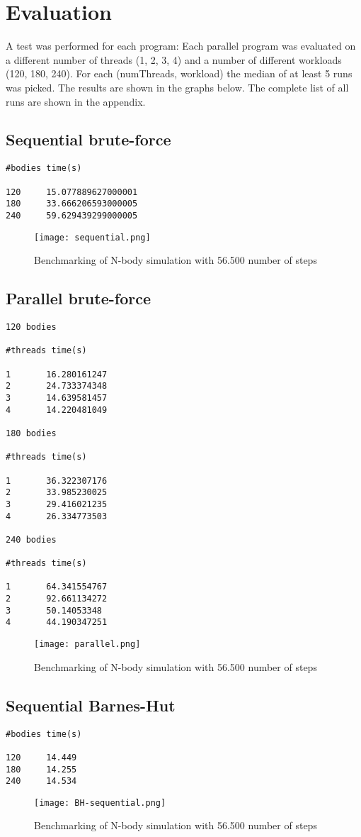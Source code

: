 \documentclass{article}
\begin{document}
\clearpage
\section{Evaluation}
A test was performed for each program: Each parallel program was evaluated on a different number of threads (1, 2, 3, 4) and a number of different workloads (120, 180, 240). For each (numThreads, workload) the median of at least 5 runs was picked. The results are shown in the graphs below. The complete list of all runs are shown in the appendix.

\subsection{Sequential brute-force}
\begin{verbatim}
#bodies time(s)

120     15.077889627000001
180     33.666206593000005
240     59.629439299000005
\end{verbatim}
\begin{figure}[h]
\centering
\texttt{[image: sequential.png]}
\caption{Benchmarking of N-body simulation with 56.500 number of steps}
\end{figure}      

\clearpage
\subsection{Parallel brute-force}
\begin{verbatim}
120 bodies

#threads time(s)

1       16.280161247
2       24.733374348
3       14.639581457
4       14.220481049

180 bodies 

#threads time(s)

1       36.322307176  
2       33.985230025  
3       29.416021235
4       26.334773503

240 bodies

#threads time(s)

1       64.341554767 
2       92.661134272 
3       50.14053348 
4       44.190347251
\end{verbatim}
\begin{figure}[h]
\centering
\texttt{[image: parallel.png]}
\caption{Benchmarking of N-body simulation with 56.500 number of steps}
\end{figure}      

\clearpage
\subsection{Sequential Barnes-Hut}
\begin{verbatim}
#bodies time(s)

120     14.449
180     14.255
240     14.534
\end{verbatim}
\begin{figure}[h]
\centering
\texttt{[image: BH-sequential.png]}
\caption{Benchmarking of N-body simulation with 56.500 number of steps}
\end{figure}      
\clearpage
\end{document}
